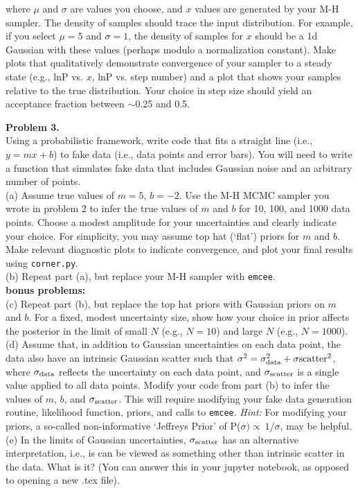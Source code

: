 \documentclass{article}
\begin{document}
\noindent where $\mu$ and $\sigma$ are values you choose, and $x$ values are generated by your M-H sampler.  The density of samples should trace the input distribution.  For example, if you select $\mu=5$ and $\sigma=1$, the density of samples for $x$ should be a 1d Gaussian with these values (perhaps modulo a normalization constant). Make plots that qualitatively demonstrate convergence of your sampler to a steady state (e.g., lnP vs. $x$, lnP vs. step number) and a plot that shows your samples relative to the true distribution. Your choice in step size should yield an acceptance fraction between $\sim$0.25 and 0.5. \\

\newpage

\noindent \textbf{Problem 3.} \\ 

\noindent Using a probabilistic framework, write code that fits a straight line (i.e., $y=mx+b$) to fake data (i.e., data points and error bars).  You will need to write a function that simulates fake data that includes Gaussian noise and an arbitrary number of points. \\

(a) Assume true values of $m=5$, $b=-2$. Use the M-H MCMC sampler you wrote in problem 2 to infer the true values of $m$ and $b$ for 10, 100, and 1000 data points.  Choose a modest amplitude for your uncertainties and clearly indicate your choice. For simplicity, you may assume top hat (`flat') priors for $m$ and $b$. Make relevant diagnostic plots to indicate convergence, and plot your final results using \texttt{corner.py}. \\

(b) Repeat part (a), but replace your M-H sampler with \texttt{emcee}. \\

\noindent \textbf{bonus problems:}\\

(c) Repeat part (b), but replace the top hat priors with Gaussian priors on $m$ and $b$.  For a fixed, modest uncertainty size, show how your choice in prior affects the posterior in the limit of small $N$ (e.g., $N=10$) and large $N$ (e.g., $N=1000$).  \\

(d) Assume that, in addition to Gaussian uncertainties on each data point, the data also have an intrinsic Gaussian scatter such that $\sigma^2 = \sigma_{\rm data}^2 + \sigma{\rm scatter}^2$, where $\sigma_{\rm data}$ reflects the uncertainty on each data point, and  $\sigma_{\rm scatter}$ is a single value applied to all data points.  Modify your code from part (b) to infer the values of $m$, $b$, and $\sigma_{\rm scatter}$.  This will require modifying your fake data generation routine, likelihood function, priors, and calls to \texttt{emcee}.  \textit{Hint:} For modifying your priors, a so-called non-informative `Jeffreys Prior' of P($\sigma) \propto\ 1/\sigma$, may be helpful. \\

(e) In the limits of Gaussian uncertainties, $\sigma_{\rm scatter}$ has an alternative interpretation, i.e., is can be viewed as something other than intrinsic scatter in the data.  What is it?  (You can answer this in your jupyter notebook, as opposed to opening a new .tex file).
\end{document}

